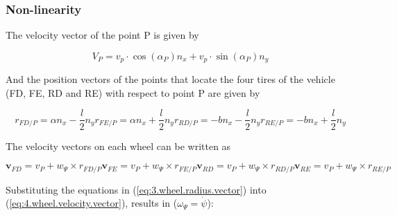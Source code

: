 \documentclass[sublist,a4paper,twoside,11pt]{article}
\begin{document}
\subsubsection{Non-linearity}

The velocity vector of the point P is given by

\begin{equation}
	\label{eq:2.P.velocity.vector}
V_P = v_p\cdot \cos(\alpha_P) n_x + v_p\cdot \sin(\alpha_P ) n_y
\end{equation}

And the position vectors of the points that locate the four tires of the vehicle (FD, FE, RD and RE) with respect to point P are given by

\begin{subequations}
	\label{eq:3.wheel.radius.vector}
	\begin{equation}
	r_{FD/P} = \alpha n_x - \frac{l}{2}n_y
	\end{equation}
	\begin{equation}
		r_{FE/P} = \alpha n_x  + \frac{l}{2}n_y
	\end{equation}
	\begin{equation}
		r_{RD/P} = -b n_x - \frac{l}{2}n_y
	\end{equation}
	\begin{equation}
		r_{RE/P} = -b n_x + \frac{l}{2}n_y
	\end{equation}
\end{subequations}


The velocity vectors on each wheel can be written as

\begin{subequations}
	\label{eq:4.wheel.velocity.vector}
\begin{equation}
\mathbf{v}_{FD}=v_P+w_\Psi \times r_{FD/P}	
\end{equation}
\begin{equation}
\mathbf{v}_{FE}=v_P+w_\Psi \times r_{FE/P}	
\end{equation}
\begin{equation}
\mathbf{v}_{RD}=v_P+w_\Psi \times r_{RD/P}	
\end{equation}
\begin{equation}
\mathbf{v}_{RE}=v_P+w_\Psi \times r_{RE/P}	
\end{equation}

\end{subequations}


Substituting the equations in (\ref{eq:3.wheel.radius.vector}) into (\ref{eq:4.wheel.velocity.vector}), results in ($\omega_{\Psi}=\dot{\psi}$): 
\end{document}
